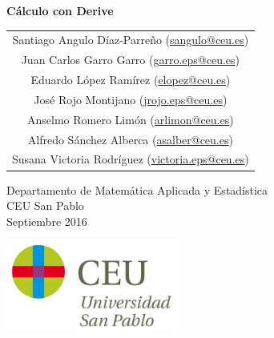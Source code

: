 \begin{titlepage}
% 
% 
\thispagestyle{empty}
\vspace*{7cm}
\par

\begin{center}
\normalfont\fontsize{30}{30}\selectfont
{\bfseries \color{blueceu}Cálculo con Derive}
\end{center}
\vspace{1cm}
\begin{center}
\Large
\begin{tabular}{c}
Santiago Angulo Díaz-Parreño (\url{sangulo@ceu.es})\\
Juan Carlos Garro Garro (\url{garro.eps@ceu.es})\\
Eduardo López Ramírez (\url{elopez@ceu.es})\\
José Rojo Montijano (\url{jrojo.eps@ceu.es})\\
Anselmo Romero Limón (\url{arlimon@ceu.es})\\
Alfredo Sánchez Alberca (\url{asalber@ceu.es})\\
Susana Victoria Rodríguez (\url{victoria.eps@ceu.es})
\end{tabular}

\medskip 
Departamento de Matemática Aplicada y Estadística\\ CEU San Pablo\\[1cm]
\medskip 
Septiembre 2016

\vspace{1cm}
\includegraphics[height=3cm]{img/logo_uspceu}
\end{center}
\vfill
\end{titlepage}